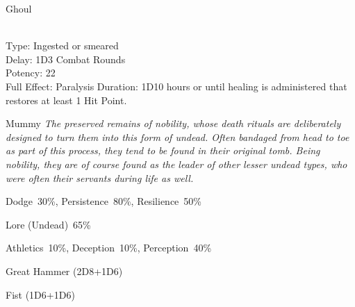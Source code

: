 \begin{samepage}
\begin{monsterbox}{Ghoul}
\begin{rpg-monsteraction}
	\end{rpg-monsteraction}
	\begin{rpg-monsteraction}
		\\Type: Ingested or smeared\\
		Delay: 1D3 Combat Rounds\\
                Potency: 22\\
		Full Effect: Paralysis
		Duration: 1D10 hours or until healing is administered that restores at least 1 Hit Point.
	\end{rpg-monsteraction}
\end{monsterbox}
\end{samepage}
	
\newpage

\begin{monsterbox}{Mummy}
	\textit{The preserved remains of nobility, whose death rituals are deliberately designed to turn them into this form of undead. Often bandaged from head to toe as part of this process, they tend to be found in their original tomb. Being nobility, they are of course found as the leader of other lesser undead types, who were often their servants during life as well.}\\
	\rpghline
	\basics[%
        hitpoints  = 18,
	majorwound = 9,
	damagemodifier = +1D6,
	powerpoints = 0,
	movementrate = 15m,
	armor = Tough Skin (2AP),
	plunderrating = 4
	]
	\rpghline%
	\stats[ %
		STR = 3D6+12 (23),
		CON = 3D6+12 (23),
		DEX = 2D6    (4),
		SIZ = 2D6+6  (13),
		INT = 2D6+6  (13),
		POW = 0      (0),
		CHA = 1      (1)
	]
	\rpghline%
	\begin{rpg-monsteraction}[Resistances]
		Dodge~30\%, Persistence~80\%, Resilience~50\%
	\end{rpg-monsteraction}
	\begin{rpg-monsteraction}[Knowledge]
		Lore (Undead)~65\%
	\end{rpg-monsteraction}
	\begin{rpg-monsteraction}[Practical]
		Athletics~10\%, Deception~10\%, Perception~40\%
	\end{rpg-monsteraction}
	\begin{rpg-monsteraction}
		Great Hammer (2D8+1D6)
	\end{rpg-monsteraction}
	\begin{rpg-monsteraction}
		Fist (1D6+1D6)
	\end{rpg-monsteraction}

\end{monsterbox}
